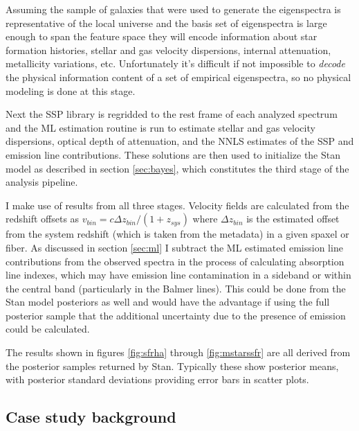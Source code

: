 \documentclass[modern]{aastex62}
\begin{document}
Assuming the sample of galaxies that were used to generate the eigenspectra is representative of the local universe and the basis set of eigenspectra is large enough to span the feature space they will encode information about star formation histories, stellar and gas velocity dispersions, internal attenuation, metallicity variations, etc. Unfortunately it's difficult if not impossible to \emph{decode} the physical information content of a set of empirical eigenspectra, so no physical modeling is done at this stage.

Next the SSP library is regridded to the rest frame of each analyzed spectrum and the ML estimation routine is run to estimate stellar and gas velocity dispersions, optical depth of attenuation, and the NNLS estimates of the SSP and emission line contributions. These solutions are then used to initialize the Stan model as described in section \ref{sec:bayes}, which constitutes the third stage of the analysis pipeline.

I make use of results from all three stages. Velocity fields are calculated from the redshift offsets as $v_{bin} = c\Delta z_{bin}/(1 + z_{sys})$ \citep{2014MNRAS.442.1117D} where $\Delta z_{bin}$ is the estimated offset from the system redshift (which is taken from the metadata) in a given spaxel or fiber. As discussed in section \ref{sec:ml} I subtract the ML estimated emission line contributions from the observed spectra in the process of calculating absorption line indexes, which may have emission line contamination in a sideband or within the central band (particularly in the Balmer lines). This could be done from the Stan model posteriors as well and would have the advantage if using the full posterior sample that the additional uncertainty due to the presence of emission could be calculated. 

The results shown in figures \ref{fig:sfrha} through \ref{fig:mstarssfr} are all derived from the posterior samples returned by Stan. Typically these show posterior means, with posterior standard deviations providing error bars in scatter plots.

\subsection{Case study background}
\label{sec:background}
\end{document}
